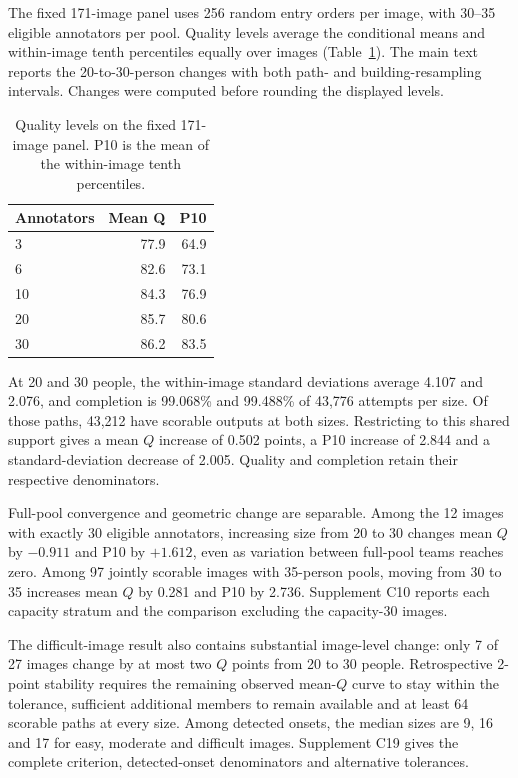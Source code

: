 The fixed 171-image panel uses 256 random entry orders per image, with 30--35 eligible annotators per pool. Quality levels average the conditional means and within-image tenth percentiles equally over images (Table~\ref{tab:d-size-levels}). The main text reports the 20-to-30-person changes with both path- and building-resampling intervals. Changes were computed before rounding the displayed levels.

\begin{table}[ht]
\centering\small
\caption{Quality levels on the fixed 171-image panel. P10 is the mean of the within-image tenth percentiles.}
\label{tab:d-size-levels}
\begin{tabular}{lrr}
\toprule
Annotators & Mean Q & P10\\
\midrule
3 & 77.9 & 64.9\\
6 & 82.6 & 73.1\\
10 & 84.3 & 76.9\\
20 & 85.7 & 80.6\\
30 & 86.2 & 83.5\\
\bottomrule
\end{tabular}
\end{table}

At 20 and 30 people, the within-image standard deviations average 4.107 and 2.076, and completion is 99.068\% and 99.488\% of 43,776 attempts per size. Of those paths, 43,212 have scorable outputs at both sizes. Restricting to this shared support gives a mean $Q$ increase of 0.502 points, a P10 increase of 2.844 and a standard-deviation decrease of 2.005. Quality and completion retain their respective denominators.

Full-pool convergence and geometric change are separable. Among the 12 images with exactly 30 eligible annotators, increasing size from 20 to 30 changes mean $Q$ by $-0.911$ and P10 by $+1.612$, even as variation between full-pool teams reaches zero. Among 97 jointly scorable images with 35-person pools, moving from 30 to 35 increases mean $Q$ by 0.281 and P10 by 2.736. Supplement C10 reports each capacity stratum and the comparison excluding the capacity-30 images.

The difficult-image result also contains substantial image-level change: only 7 of 27 images change by at most two $Q$ points from 20 to 30 people. Retrospective 2-point stability requires the remaining observed mean-$Q$ curve to stay within the tolerance, sufficient additional members to remain available and at least 64 scorable paths at every size. Among detected onsets, the median sizes are 9, 16 and 17 for easy, moderate and difficult images. Supplement C19 gives the complete criterion, detected-onset denominators and alternative tolerances.

